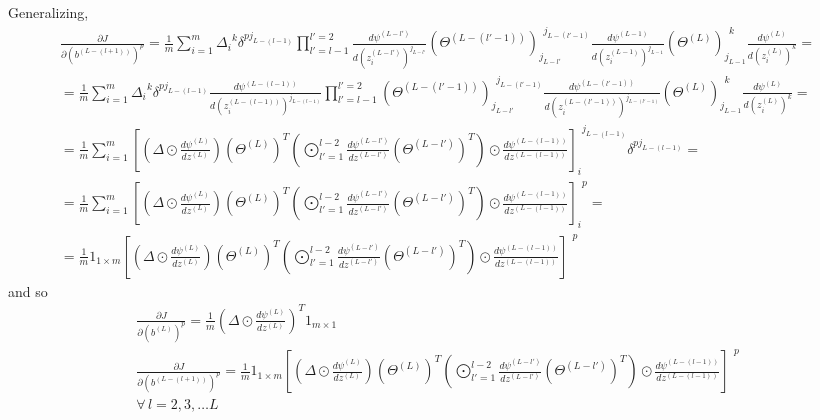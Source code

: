 \documentclass[10pt]{amsart}
\begin{document}
\begin{multicols*}{2}
Generalizing, 
\[
\begin{gathered}
	\frac{ \partial J }{ \partial (b^{(L-(l+1) )} )^p } = \frac{1}{m} \sum_{i=1}^m \Delta_i^{\  \  k} \delta^{pj_{L-(l-1)}} \prod_{l'=l-1}^{l'=2} \frac{d\psi^{(L-l')}}{ d(z_i^{(L-l')})^{j_{L-l'}} } (\Theta^{(L-(l'-1))})_{j_{L-l'}}^{\  \  j_{L-(l'-1)}} \frac{d \psi^{(L-1)} }{ d(z_i^{(L-1)})^{j_{L-1}} } (\Theta^{(L)})_{j_{L-1}}^{ \  \ k } \frac{d\psi^{(L)} }{ d(z_i^{(L)})^k }  = \\
= \frac{1}{m} \sum_{i=1}^m \Delta_i^{\  \  k} \delta^{pj_{L-(l-1)}} \frac{d\psi^{(L-(l-1))} }{ d(z_i^{(L-(l-1))})^{j_{L-(l-1)}} }    \prod_{l'=l-1}^{l'=2} (\Theta^{(L-(l'-1))})_{j_{L-l'}}^{ \  \  j_{L-(l'-1)}} \frac{d \psi^{(L-(l'-1))} }{ d (z_i^{(L-(l'-1))})^{j_{L-(l'-1)}} } (\Theta^{(L)})_{j_{L-1}}^{\  \  k } \frac{d \psi^{(L)} }{ d(z_i^{(L)})^k}	= \\
	= \frac{1}{m} \sum_{i=1}^m \left[ (\Delta \odot \frac{d\psi^{(L)} }{ dz^{(L)} } )(\Theta^{(L)})^T \left( \bigodot^{l-2}_{ l'=1} \frac{d \psi^{(L-l')} }{ dz^{(L-l')}} (\Theta^{(L-l')})^T \right) \odot \frac{d\psi^{ (L-(l-1))} }{ dz^{(L-(l-1))}} \right]_i^{\  \  j_{L-(l-1)}} \delta^{p j_{L-(l-1)}} = \\
	= \frac{1}{m} \sum_{i=1}^m \left[ (\Delta \odot \frac{d\psi^{(L)} }{ dz^{(L)} } )(\Theta^{(L)})^T \left( \bigodot^{l-2}_{ l'=1} \frac{d \psi^{(L-l')} }{ dz^{(L-l')}} (\Theta^{(L-l')})^T \right) \odot \frac{d\psi^{ (L-(l-1))} }{ dz^{(L-(l-1))}} \right]_i^{\  \  p }  = \\
	= \frac{1}{m}  1_{1\times m } \left[ (\Delta \odot \frac{d\psi^{(L)} }{ dz^{(L)} } )(\Theta^{(L)})^T \left( \bigodot^{l-2}_{ l'=1} \frac{d \psi^{(L-l')} }{ dz^{(L-l')}} (\Theta^{(L-l')})^T \right) \odot \frac{d\psi^{ (L-(l-1))} }{ dz^{(L-(l-1))}} \right]^{\  \  p } 
\end{gathered}
\]
and so 
\begin{equation}\label{Eq:DNN_gradJ_L2norm_bs}
\boxed{ \begin{gathered}
\frac{\partial J}{ \partial (b^{(L)})^p } = \frac{1}{m} ( \Delta \odot \frac{d\psi^{(L)}}{dz^{(L)}})^T 1_{m\times 1}   \\
\frac{ \partial J }{ \partial (b^{(L-(l+1) )} )^p } =  \frac{1}{m}  1_{1\times m } \left[ (\Delta \odot \frac{d\psi^{(L)} }{ dz^{(L)} } )(\Theta^{(L)})^T \left( \bigodot^{l-2}_{ l'=1} \frac{d \psi^{(L-l')} }{ dz^{(L-l')}} (\Theta^{(L-l')})^T \right) \odot \frac{d\psi^{ (L-(l-1))} }{ dz^{(L-(l-1))}} \right]^{\  \  p } \\
\forall \, l = 2,3, \dots L
\end{gathered} }
\end{equation}



\end{multicols*}
\end{document}
